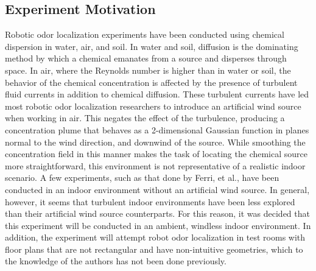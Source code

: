 \documentclass[submit]{aiaa-pretty-modified}
\begin{document}
\subsection{Experiment Motivation}
Robotic odor localization experiments have been conducted using chemical
dispersion in water, air, and soil.\cite{kowadlo} In water and soil, diffusion is the
dominating method by which a chemical emanates from a source and disperses
through space. In air, where the Reynolds number is higher than in water or
soil, the behavior of the chemical concentration is affected by the presence of
turbulent fluid currents in addition to chemical diffusion.\cite{kowadlo} These turbulent
currents have led most robotic odor localization researchers to introduce an
artificial wind source when working in air. This negates the effect of the
turbulence, producing a concentration plume that behaves as a 2-dimensional
Gaussian function in planes normal to the wind direction, and downwind of the
source. \cite{ferri} While smoothing the concentration field in this manner makes the task of locating the
chemical source more straightforward, this environment is not representative of
a realistic indoor scenario. A few experiments, such as that done by Ferri, et
al., have been conducted in an indoor environment without an artificial wind
source. \cite{ferri} In general, however, it seems that turbulent indoor environments
have been less explored than their artificial wind source counterparts. For this
reason, it was decided that this experiment will be conducted in an ambient,
windless indoor environment. In addition, the experiment will attempt robot odor
localization in test rooms with floor plans that are not rectangular and have
non-intuitive geometries, which to the knowledge of the authors has not been done
previously.
\end{document}
